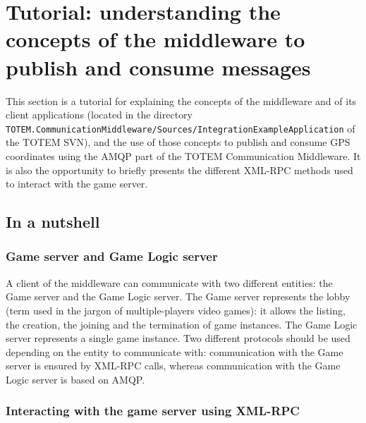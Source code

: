 

\section{Tutorial: understanding the concepts of the middleware to publish and 
consume messages}
\label{S_tutorialprotocol}

This section is a tutorial for explaining the concepts of the
middleware and of its client applications (located in the directory
\texttt{TOTEM.CommunicationMiddleware/Sources/IntegrationExampleApplication}
of the TOTEM SVN), and the use of those concepts to publish and
consume GPS coordinates using the AMQP part of the TOTEM Communication
Middleware. It is also the opportunity to briefly presents the
different XML-RPC methods used to interact with the game server.

\subsection{In a nutshell}
\label{SS_nutshell}

\subsubsection{Game server and Game Logic server}

A client of the middleware can communicate with two different 
entities: the Game server and the Game Logic server. The Game 
server represents the lobby (term used in the jargon 
of multiple-players video games): it allows the listing, the creation, 
the joining and the termination of game instances. The Game 
Logic server represents a single game instance. Two different
protocols should be used depending on the entity to communicate with: 
communication with the Game server is ensured by XML-RPC calls, whereas 
communication with the Game Logic server is based on AMQP.

\subsubsection{Interacting with the game server using XML-RPC}

